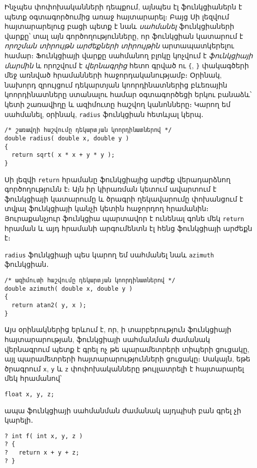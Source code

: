 Ինչպես փոփոխականների դեպքում, այնպես էլ ֆունկցիաներն է պետք օգտագործումից
առաջ հայտարարել։ Բայց Սի լեզվում հայտարարելուց բացի պետք է նաև \emph{սահմանել}
ֆունկցիաների վարքը՝ տալ այն գործողությունները, որ ֆունկցիան կատարում է
\emph{որոշման տիրույթն} \emph{արժեքների տիրույթին} արտապատկերելու համար։
Ֆունկցիայի վարքը սահմանող բլոկը կոչվում է \emph{ֆունկցիայի մարմին} և որոշվում
է \emph{վերնագրից} հետո գրված ու \verb|{|, \verb|}| փակագծերի մեջ առնված
հրամանների հաջորդականությամբ։ Օրինակ, նախորդ զրույցում դեկարտյան կոորդինատներից
բևեռային կոորդինատները ստանալու համար օգտագործեցի երկու բանաձև՝ կետի շառավիղը
և ազիմուտը հաշվող կանոնները։ Կարող եմ սահմանել, օրինակ, \texttt{radius}
ֆունկցիան հետևյալ կերպ․

\begin{verbatim}
/* շառավղի հաշվումը դեկարտյան կոորդինատներով */
double radius( double x, double y )
{
  return sqrt( x * x + y * y );
}
\end{verbatim}

Սի լեզվի \texttt{return} հրամանը ֆունկցիայից արժեք վերադարձնող գործողությունն
է։ Այն իր կիրառման կետում ավարտում է ֆունկցիայի կատարումը և ծրագրի ղեկավարումը
փոխանցում է տվյալ ֆունկցիայի կանչի կետին հաջորդող հրամանին։ Յուրաքանչյուր
ֆունկցիա պարտավոր է ունենալ գոնե մեկ \texttt{return} հրաման և այդ հրամանի
արգումենտն էլ հենց ֆունկցիայի արժեքն է։

\texttt{radius} ֆունկցիայի պես կարող եմ սահմանել նաև \texttt{azimuth} ֆունկցիան․

\begin{verbatim}
/* ազիմուտի հաշվումը դեկարտյան կոորդինատներով */
double azimuth( double x, double y )
{
  return atan2( y, x );
}
\end{verbatim}

Այս օրինակներից երևում է, որ, ի տարբերություն ֆունկցիայի հայտարարության,
ֆունկցիայի սահմանման ժամանակ վերնագրում պետք է գրել ոչ թե պարամետրերի տիպերի
ցուցակը, այլ պարամետրերի հայտարարությունների ցուցակը։ Սակայն, եթե ծրագրում
\texttt{x}, \texttt{y} և \texttt{z} փոփոխականները թույլատրելի է հայտարարել
մեկ հրամանով՝

\begin{verbatim}
float x, y, z;
\end{verbatim}

ապա ֆունկցիայի սահմանման ժամանակ այդպիսի բան գրել չի կարելի․

\begin{verbatim}
? int f( int x, y, z )
? {
?   return x + y + z;
? }
\end{verbatim}

